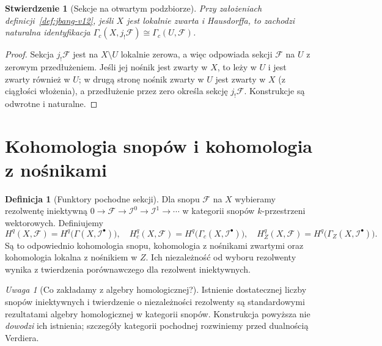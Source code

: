\documentclass[11pt,a4paper,oneside]{report}
\theoremstyle{plain}
\newtheorem{stwierdzenie}[twierdzenie]{Stwierdzenie}
\theoremstyle{definition}
\newtheorem{definicja}[twierdzenie]{Definicja}
\theoremstyle{remark}
\newtheorem{uwaga}[twierdzenie]{Uwaga}
\begin{document}
\begin{stwierdzenie}[Sekcje na otwartym podzbiorze]
\label{prop:jbang-sections-v12}
Przy założeniach definicji~\ref{def:jbang-v12}, jeśli $X$ jest lokalnie
zwarta i Hausdorffa, to zachodzi naturalna identyfikacja
$\Gamma_c(X,j_!\mathcal F)\cong\Gamma_c(U,\mathcal F)$.
\end{stwierdzenie}
\begin{proof}
Sekcja $j_!\mathcal F$ jest na $X\setminus U$ lokalnie zerowa,
a więc odpowiada sekcji $\mathcal F$ na $U$ z zerowym przedłużeniem.
Jeśli jej nośnik jest zwarty w $X$, to leży w $U$ i jest
zwarty również w $U$; w drugą stronę nośnik zwarty w $U$
jest zwarty w $X$ (z ciągłości włożenia), a przedłużenie
przez zero określa sekcję $j_!\mathcal F$.
Konstrukcje są odwrotne i naturalne.
\end{proof}

\section{Kohomologia snopów i kohomologia z nośnikami}
\begin{definicja}[Funktory pochodne sekcji]
\label{def:sheaf-cohom-v12}
Dla snopu $\mathcal F$ na $X$ wybieramy rezolwentę iniektywną
$0\to\mathcal F\to\mathcal I^0\to\mathcal I^1\to\cdots$
w kategorii snopów $k$-przestrzeni wektorowych. Definiujemy
\[
H^q(X,\mathcal F)=H^q\bigl(\Gamma(X,\mathcal I^\bullet)\bigr),
\quad H_c^q(X,\mathcal F)
=H^q\bigl(\Gamma_c(X,\mathcal I^\bullet)\bigr),
\quad H_Z^q(X,\mathcal F)
=H^q\bigl(\Gamma_Z(X,\mathcal I^\bullet)\bigr).
\]
Są to odpowiednio kohomologia snopu, kohomologia z nośnikami
zwartymi oraz kohomologia lokalna z nośnikiem w $Z$.
Ich niezależność od wyboru rezolwenty wynika z twierdzenia
porównawczego dla rezolwent iniektywnych.
\end{definicja}

\begin{uwaga}[Co zakładamy z algebry homologicznej?]
Istnienie dostatecznej liczby snopów iniektywnych i twierdzenie
o niezależności rezolwenty są standardowymi rezultatami
algebry homologicznej w kategorii snopów. Konstrukcja powyższa
nie \emph{dowodzi} ich istnienia; szczegóły kategorii
pochodnej rozwiniemy przed dualnością Verdiera.
\end{uwaga}
\end{document}
